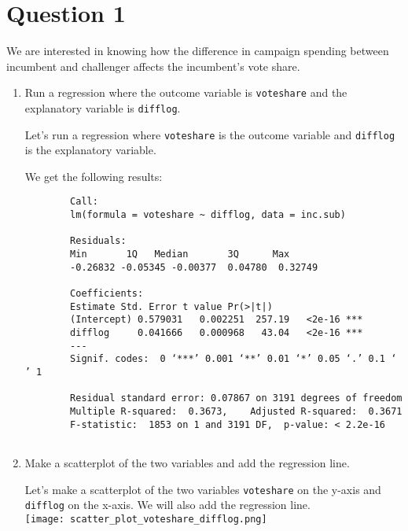 \documentclass[12pt,letterpaper]{article}
\begin{document}
\section*{Question 1}
\vspace{.25cm}
\noindent We are interested in knowing how the difference in campaign spending between incumbent and challenger affects the incumbent's vote share. 
	\begin{enumerate}
		\item Run a regression where the outcome variable is \texttt{voteshare} and the explanatory variable is \texttt{difflog}.	
		
		Let's run a regression where  \texttt{voteshare}  is the outcome variable and \texttt{difflog} is the explanatory variable.
		
		
		We get the following results:
		\begin{verbatim}
		Call:
		lm(formula = voteshare ~ difflog, data = inc.sub)
		
		Residuals:
		Min       1Q   Median       3Q      Max 
		-0.26832 -0.05345 -0.00377  0.04780  0.32749 
		
		Coefficients:
		Estimate Std. Error t value Pr(>|t|)    
		(Intercept) 0.579031   0.002251  257.19   <2e-16 ***
		difflog     0.041666   0.000968   43.04   <2e-16 ***
		---
		Signif. codes:  0 ‘***’ 0.001 ‘**’ 0.01 ‘*’ 0.05 ‘.’ 0.1 ‘ ’ 1
		
		Residual standard error: 0.07867 on 3191 degrees of freedom
		Multiple R-squared:  0.3673,	Adjusted R-squared:  0.3671 
		F-statistic:  1853 on 1 and 3191 DF,  p-value: < 2.2e-16
			
		\end{verbatim}
		
		
		\vspace{5cm}
		\item Make a scatterplot of the two variables and add the regression line. 	
		
		Let's make a scatterplot of the two variables \texttt{voteshare} on the y-axis and \texttt{difflog} on the x-axis. We will also add the regression line. \\
		
		
		\texttt{[image: scatter\_plot\_voteshare\_difflog.png]}
		

\end{enumerate}
\end{document}
